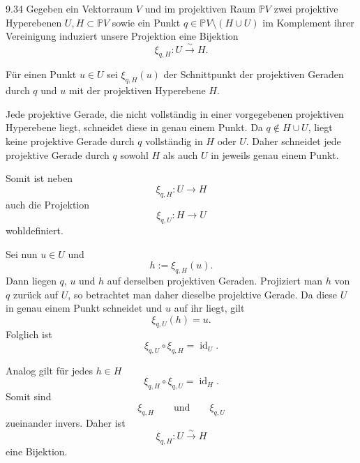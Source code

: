 \begin{exercise}{9.3}{4}
    Gegeben ein Vektorraum \(V\) und im projektiven Raum \(\mathbb P V\) zwei
    projektive Hyperebenen \(U,H\subset\mathbb P V\) sowie ein Punkt \(q\in \mathbb P V\setminus(H\cup U)\)
    im Komplement ihrer Vereinigung induziert unsere Projektion eine Bijektion
    \[
        \xi_{q,H}\colon U\xrightarrow{\sim}H.
    \]
\end{exercise}

Für einen Punkt \(u\in U\) sei \(\xi_{q,H}(u)\)
der Schnittpunkt der projektiven Geraden durch \(q\) und \(u\) mit der
projektiven Hyperebene \(H\).

Jede projektive Gerade, die nicht vollständig in einer vorgegebenen
projektiven Hyperebene liegt, schneidet diese in genau einem Punkt.
Da \(q\notin H\cup U\),
liegt keine projektive Gerade durch \(q\) vollständig in \(H\) oder \(U\).
Daher schneidet jede projektive Gerade durch \(q\) sowohl \(H\) als auch
\(U\) in jeweils genau einem Punkt.

Somit ist neben
\[
    \xi_{q,H}\colon U\to H
\]
auch die Projektion
\[
    \xi_{q,U}\colon H\to U
\]
wohldefiniert.

Sei nun \(u\in U\) und
\[
    h:=\xi_{q,H}(u).
\]
Dann liegen \(q\), \(u\) und \(h\) auf derselben projektiven Geraden.
Projiziert man \(h\) von \(q\) zurück auf \(U\), so betrachtet man daher
dieselbe projektive Gerade. Da diese \(U\) in genau einem Punkt schneidet
und \(u\) auf ihr liegt, gilt
\[
    \xi_{q,U}(h)=u.
\]
Folglich ist
\[
    \xi_{q,U}\circ\xi_{q,H}
    =
    \operatorname{id}_U.
\]

Analog gilt für jedes \(h\in H\)
\[
    \xi_{q,H}\circ\xi_{q,U}
    =
    \operatorname{id}_H.
\]
Somit sind
\[
    \xi_{q,H}
    \qquad\text{und}\qquad
    \xi_{q,U}
\]
zueinander invers. Daher ist
\[
    \boxed{
        \xi_{q,H}\colon U\xrightarrow{\sim}H
    }
\]
eine Bijektion.
